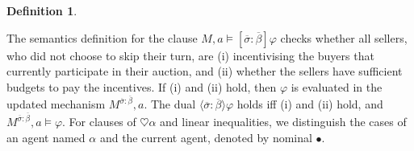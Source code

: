 \documentclass[letterpaper]{article} %
\theoremstyle{definition}
\newtheorem{definition}{Definition}
\begin{document}
\begin{definition}
\end{definition}

The semantics definition for the clause $M, a \models [\overline{\sigma}:\overline{\beta}] \varphi$ checks whether all sellers, who did not choose to skip their turn, are (i) incentivising the buyers that currently participate in their auction, and (ii) whether the sellers have sufficient budgets to pay the incentives. If (i) and (ii) hold, then $\varphi$ is evaluated in the updated mechanism  $M^{\overline{\sigma}:\overline{\beta}},a$. %
The dual $\langle \overline{\sigma}:\overline{\beta} \rangle \varphi$ holds iff (i) and (ii) hold, and $M^{\overline{\sigma}:\overline{\beta}},a \models \varphi$.
For clauses of $\heartsuit \alpha$ and linear inequalities, we distinguish the cases of an agent named $\alpha$ and the current agent, denoted by nominal $\bullet$. %

\end{document}
